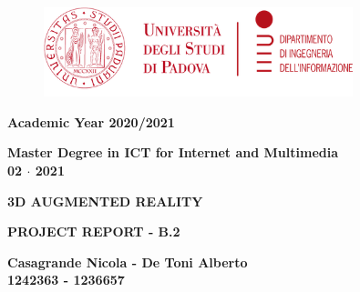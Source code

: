 
\begin{titlepage}
   \begin{center}
   \begin{doublespacing}

       \begin{figure}
       \centering
       \includegraphics[width=0.8\textwidth]{images/logo.png}
       \end{figure}
       
       \vspace*{10mm}
       {\large\textbf{Academic Year 2020/2021}}
       
       
       \vspace{10mm}
       {\large\textbf{Master Degree in ICT for Internet and Multimedia}\\
       \vspace{10mm}
       \textbf{02 $\cdot$ 2021}}

       
       
       \vspace*{5mm}
       {\Large\textbf{3D AUGMENTED REALITY}}

       \vspace{30mm}
       
       {\Large\textbf{PROJECT REPORT - B.2}}

    
            
       \vspace{30mm}

       {\large\textbf{Casagrande Nicola - De Toni Alberto}\\
       \textbf{1242363 - 1236657}}

       \vfill
              
    \end{doublespacing}

   \end{center}
\end{titlepage}
